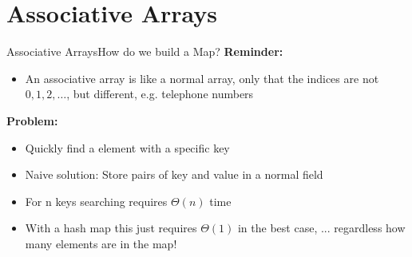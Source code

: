 \section{Associative Arrays}


\begin{frame}{Associative Arrays}{How do we build a Map?}
  \textbf{Reminder:}
  \begin{itemize}
  \item An associative array is like a normal array, only that
    the indices are not {\color{MainA}$0, 1, 2, \ldots$}, but
    different, e.g. telephone numbers
  \end{itemize}
  \textbf{Problem:}
  \begin{itemize}
  \item Quickly find a element with a specific key
  \item Naive solution: Store pairs of key and value
    in a normal field
  \item For {\color{MainA}n} keys searching requires {\color{MainA} $\Theta(n)$} time
  \item With a {\color{MainA}hash map} this just requires {\color{MainA} $\Theta(1)$}
    in the best case, ... regardless how many elements are in the map!
  \end{itemize}
\end{frame}

